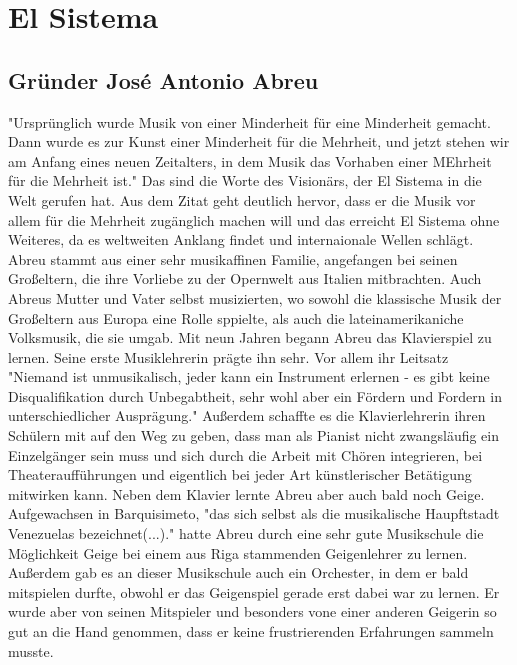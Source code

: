\section{El Sistema}

\subsection{Gründer José Antonio Abreu}
"Ursprünglich wurde Musik von einer Minderheit für eine Minderheit gemacht. Dann
wurde es zur Kunst einer Minderheit für die Mehrheit, und jetzt stehen wir am
Anfang eines neuen Zeitalters, in dem Musik das Vorhaben einer MEhrheit für die
Mehrheit ist." \autocite[5]{kaufmann:el_sistema}
Das sind die Worte des Visionärs, der El Sistema in die Welt gerufen hat. Aus
dem Zitat geht deutlich hervor, dass er die Musik vor allem für die Mehrheit
zugänglich machen will und das erreicht El Sistema ohne Weiteres, da es
weltweiten Anklang findet und internaionale Wellen schlägt.
Abreu stammt aus einer sehr musikaffinen Familie, angefangen bei seinen
Großeltern, die ihre Vorliebe zu der Opernwelt aus Italien mitbrachten. Auch
Abreus Mutter und Vater selbst musizierten, wo sowohl die klassische Musik der
Großeltern aus Europa eine Rolle sppielte, als auch die lateinamerikaniche
Volksmusik, die sie umgab. Mit neun Jahren begann Abreu das Klavierspiel zu
lernen. Seine erste Musiklehrerin prägte ihn sehr. Vor allem ihr Leitsatz
"Niemand ist unmusikalisch, jeder kann ein Instrument erlernen - es gibt keine
Disqualifikation durch Unbegabtheit, sehr wohl aber ein Fördern und Fordern in
unterschiedlicher Ausprägung." \autocite[20]{kaufmann:el_sistema} Außerdem
schaffte es die Klavierlehrerin ihren Schülern mit auf den Weg zu geben, dass
man als Pianist nicht zwangsläufig ein Einzelgänger sein muss und sich durch die
Arbeit mit Chören integrieren, bei Theateraufführungen und eigentlich bei jeder
Art künstlerischer Betätigung mitwirken kann. Neben dem
Klavier lernte Abreu aber auch bald noch Geige.
Aufgewachsen in Barquisimeto, "das sich selbst als die musikalische Haupftstadt
Venezuelas bezeichnet(...)." \autocite[22]{kaufmann:el_sistema} hatte Abreu
durch eine sehr gute Musikschule die Möglichkeit Geige bei einem aus Riga
stammenden Geigenlehrer zu lernen. Außerdem gab es an dieser Musikschule auch
ein Orchester, in dem er bald mitspielen durfte, obwohl er das Geigenspiel
gerade erst dabei war zu lernen. Er wurde aber von seinen Mitspieler und
besonders vone einer anderen Geigerin so gut an
die Hand genommen, dass er keine frustrierenden Erfahrungen sammeln musste.
